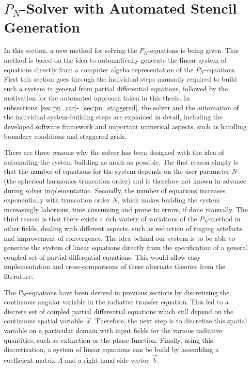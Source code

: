 \section{$P_N$-Solver with Automated Stencil Generation}
\label{sec:pn_solver}

In this section, a new method for solving the $P_N$-equations is being given. This method is based on the idea to automatically generate the linear system of equations directly from a computer algeba representation of the $P_N$-equations. First this section goes through the individual steps manually required to build such a system in general from partial differential equations, followed by the motivation for the automated approach taken in this thesis. In subsections~\ref{sec:pn_car}-~\ref{sec:pn_staggered}, the solver and the automation of the individual system-building steps are explained in detail, including the developed software framework and important numerical aspects, such as handling boundary conditions and staggered grids.

There are three reasons why the solver has been designed with the idea of automating the system building as much as possible. The first reason simply is that the number of equations for the system depends on the user parameter $N$ (the spherical harmonics truncation order) and is therefore not known in advance during solver implementation. Secondly, the number of equations increases exponentially with truncation order $N$, which makes building the system increasingly laborious, time consuming and prone to errors, if done manually. The third reason is that there exists a rich variety of variations of the $P_N$-method in other fields, dealing with different aspects, such as reduction of ringing artefacts and improvement of convergence. The idea behind our system is to be able to generate the system of linear equations directly from the specification of a general coupled set of partial differential equations. This would allow easy implementation and cross-comparisons of these alternate theories from the literature.

The $P_N$-equations have been derived in previous sections by discretizing the continuous angular variable in the radiative transfer equation. This led to a discrete set of coupled partial differential equations which still depend on the continuous spatial variable~$\vec{x}$. Therefore, the next step is to discretize this spatial variable on a particular domain with input fields for the various radiative quantities, such as extinction or the phase function. Finally, using this discretization, a system of linear equations can be build by assembling a coefficient matrix $A$ and a right hand side vector~$\vec{b}$.


